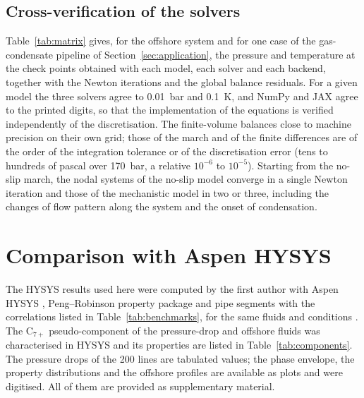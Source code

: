 \documentclass[a4paper,fleqn]{cas-sc}
\begin{document}
\subsection{Cross-verification of the solvers}\label{sec:matrix}

Table~\ref{tab:matrix} gives, for the offshore system and for one case of the gas-condensate pipeline of Section~\ref{sec:application}, the pressure and temperature at the check points obtained with each model, each solver and each backend, together with the Newton iterations and the global balance residuals. For a given model the three solvers agree to \SI{0.01}{\bar} and \SI{0.1}{\kelvin}, and NumPy and JAX agree to the printed digits, so that the implementation of the equations is verified independently of the discretisation. The finite-volume balances close to machine precision on their own grid; those of the march and of the finite differences are of the order of the integration tolerance or of the discretisation error (tens to hundreds of pascal over \SI{170}{\bar}, a relative $10^{-6}$ to $10^{-5}$). Starting from the no-slip march, the nodal systems of the no-slip model converge in a single Newton iteration and those of the mechanistic model in two or three, including the changes of flow pattern along the system and the onset of condensation.

\begin{table}[htbp]
\caption{Two models, three solvers and two backends on the offshore system and on case 3 of the gas-condensate pipeline.}\label{tab:matrix}
\footnotesize
\resizebox{\textwidth}{!}{}

\end{table}

\section{Comparison with Aspen HYSYS}\label{sec:hysys}

The HYSYS results used here were computed by the first author with Aspen HYSYS \citep{aspenhysys}, Peng--Robinson property package and pipe segments with the correlations listed in Table~\ref{tab:benchmarks}, for the same fluids and conditions \citep{carvalho2022}. The C$_{7+}$ pseudo-component of the pressure-drop and offshore fluids was characterised in HYSYS and its properties are listed in Table~\ref{tab:components}. The pressure drops of the 200 lines are tabulated values; the phase envelope, the property distributions and the offshore profiles are available as plots and were digitised. All of them are provided as supplementary material.
\end{document}
